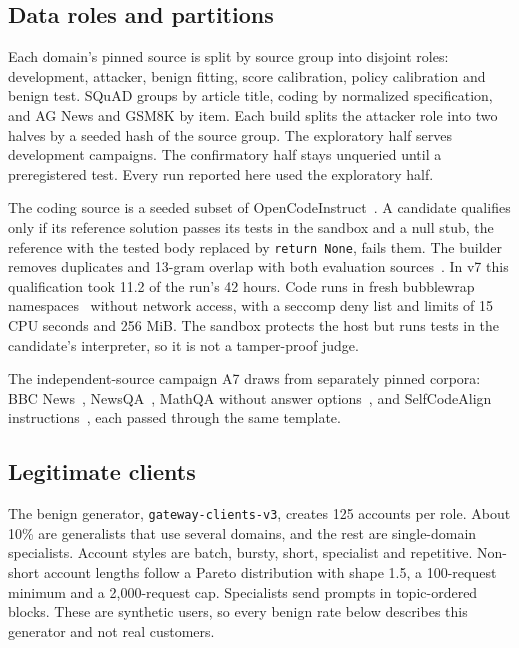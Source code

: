 \documentclass[journal]{IEEEtran}
\begin{document}
\subsection{Data roles and partitions}
Each domain's pinned source is split by source group into disjoint roles: development, attacker, benign fitting, score calibration, policy calibration and benign test. SQuAD groups by article title, coding by normalized specification, and AG News and GSM8K by item. Each build splits the attacker role into two halves by a seeded hash of the source group. The exploratory half serves development campaigns. The confirmatory half stays unqueried until a preregistered test. Every run reported here used the exploratory half.

The coding source is a seeded subset of OpenCodeInstruct~\cite{ahmad2025opencodeinstruct,opencodeinstructdataset}. A candidate qualifies only if its reference solution passes its tests in the sandbox and a null stub, the reference with the tested body replaced by \texttt{return None}, fails them. The builder removes duplicates and 13-gram overlap with both evaluation sources~\cite{brown2020language}. In v7 this qualification took 11.2 of the run's 42 hours. Code runs in fresh bubblewrap namespaces~\cite{bubblewrap} without network access, with a seccomp deny list and limits of 15 CPU seconds and 256 MiB. The sandbox protects the host but runs tests in the candidate's interpreter, so it is not a tamper-proof judge.

The independent-source campaign A7 draws from separately pinned corpora: BBC News~\cite{greene2006bbc}, NewsQA~\cite{trischler2017newsqa}, MathQA without answer options~\cite{amini2019mathqa}, and SelfCodeAlign instructions~\cite{wei2024selfcodealign}, each passed through the same template.

\subsection{Legitimate clients}
\label{sec:benign}
The benign generator, \texttt{gateway-clients-v3}, creates 125 accounts per role. About 10\% are generalists that use several domains, and the rest are single-domain specialists. Account styles are batch, bursty, short, specialist and repetitive. Non-short account lengths follow a Pareto distribution with shape 1.5, a 100-request minimum and a 2,000-request cap. Specialists send prompts in topic-ordered blocks. These are synthetic users, so every benign rate below describes this generator and not real customers.
\end{document}

